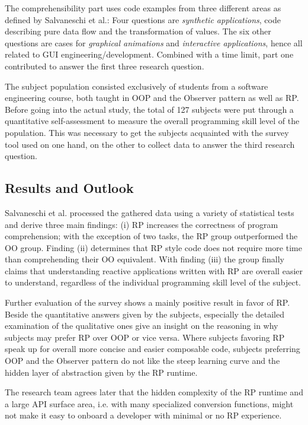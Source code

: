 \documentclass[12pt,a4paper]{article}
\begin{document}
The comprehensibility part uses code examples from three different areas as defined by Salvaneschi et al.: Four questions are \emph{synthetic applications}, code describing pure data flow and the transformation of values. The six other questions are cases for \emph{graphical animations} and \emph{interactive applications}, hence all related to GUI engineering/development. Combined with a time limit, part one contributed to answer the first three research question.

The subject population consisted exclusively of students from a software engineering course, both taught in OOP and the Observer pattern as well as RP. Before going into the actual study, the total of 127 subjects were put through a quantitative self-assessment to measure the overall programming skill level of the population. This was necessary to get the subjects acquainted with the survey tool used on one hand, on the other to collect data to answer the third research question.

\subsection{Results and Outlook}

Salvaneschi et al. processed the gathered data using a variety of statistical tests and derive three main findings: (i) RP increases the correctness of program comprehension; with the exception of two tasks, the RP group outperformed the OO group. Finding (ii) determines that RP style code does not require more time than comprehending their OO equivalent. With finding (iii) the group finally claims that understanding reactive applications written with RP are overall easier to understand, regardless of the individual programming skill level of the subject.

Further evaluation of the survey shows a mainly positive result in favor of RP. Beside the quantitative answers given by the subjects, especially the detailed examination of the qualitative ones give an insight on the reasoning in why subjects may prefer RP over OOP or vice versa. Where subjects favoring RP speak up for overall more concise and easier composable code, subjects preferring OOP and the Observer pattern do not like the steep learning curve and the hidden layer of abstraction given by the RP runtime.

The research team agrees later that the hidden complexity of the RP runtime and a large API surface area, i.e. with many specialized conversion functions, might not make it easy to onboard a developer with minimal or no RP experience.
\end{document}
